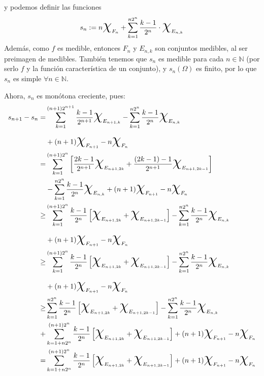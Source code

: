 \documentclass[11pt, a4paper]{article}
\makeatletter
\newif\IfInSansMode
\let\oldsf\sffamily
\renewcommand*{\sffamily}{\oldsf\mathversion{sans}\InSansModetrue}
\let\oldnorm\normalfont
\renewcommand*{\normalfont}{\oldnorm\InSansModefalse\mathversion{normal}}
\renewenvironment{proof}[1][\proofname] {\par\pushQED{\qed}\normalfont\topsep6\p@\@plus6\p@\relax\trivlist\item[\hskip\labelsep\itshape\sffamily#1\@addpunct{.}]\ignorespaces}{\popQED\endtrivlist\@endpefalse}
\theoremstyle{theorem-style}
\theoremstyle{definition-style}
\theoremstyle{remark-style}
\theoremstyle{example-style}
\makeatother
\begin{document}
\begin{proof}
  y podemos definir las funciones
  \[
    s_n := n\text{\huge {$\chi$}}_{F_n} + \sum_{k=1}^{n2^n}\dfrac{k-1}{2^n}\cdot \text{\huge {$\chi$}}_{E_{n,k}}
  \]
  Además, como $f$ es medible, entonces $F_n$ y $E_{n,k}$ son conjuntos medibles, al ser preimagen de medibles. También tenemos que $s_n$ es medible para cada $n \in \mathbb{N}$ (por serlo $f$ y la función característica de un conjunto), y $s_n(\Omega)$ es finito, por lo que $s_n$ es simple $\forall n \in \mathbb{N}$.

  Ahora, ${s_n}$ es monótona creciente, pues:
      \begin{align*}
 s_{n+1}-s_n =&  \sum_{k=1}^{(n+1)2^{n+1}} \frac{k-1}{2^{n+1}} \text{\huge $\chi$}_{E_{n+1,k}} 
				- \sum_{k=1}^{n2^n} \frac{k-1}{2^n} \text{\huge $\chi$}_{E_{n,k}} 
				\\
			&+	(n+1) \text{\huge{$\chi$}}_{F_{n+1}} - n \text{\huge{$\chi$}}_{F_n} 
				\\ %
			=& \sum_{k=1}^{(n+1)2^{n}} \left[ \frac{2k-1}{2^{n+1}} \text{\huge $\chi$}_{E_{n+1,2k}} 
									+ \frac{(2k-1)-1}{2^{n+1}} \text{\huge $\chi$}_{E_{n+1,2k-1}}  \right]
									\\
			&
				- \sum_{k=1}^{n2^n} \frac{k-1}{2^n} \text{\huge $\chi$}_{E_{n,k}} 
				+	(n+1) \text{\huge{$\chi$}}_{F_{n+1}} - n \text{\huge{$\chi$}}_{F_n}
				\\
			\geq& \sum_{k=1}^{(n+1)2^{n}} \frac{k-1}{2^{n}} \left[  \text{\huge $\chi$}_{E_{n+1,2k}} 
									+ \text{\huge $\chi$}_{E_{n+1,2k-1}}  \right]
				- \sum_{k=1}^{n2^n} \frac{k-1}{2^n} \text{\huge $\chi$}_{E_{n,k}} 
				\\
				&+	(n+1) \text{\huge{$\chi$}}_{F_{n+1}} - n \text{\huge{$\chi$}}_{F_n}\\
				\geq& \sum_{k=1}^{(n+1)2^{n}} \frac{k-1}{2^{n}} \left[  \text{\huge $\chi$}_{E_{n+1,2k}} 
									+ \text{\huge $\chi$}_{E_{n+1,2k-1}}  \right]
				- \sum_{k=1}^{n2^n} \frac{k-1}{2^n} \text{\huge $\chi$}_{E_{n,k}} 
				\\
				&+	(n+1) \text{\huge{$\chi$}}_{F_{n+1}} - n \text{\huge{$\chi$}}_{F_n}
				\\ %
				\geq& \sum_{k=1}^{n2^{n}} \frac{k-1}{2^{n}} \left[  \text{\huge $\chi$}_{E_{n+1,2k}} 
									+ \text{\huge $\chi$}_{E_{n+1,2k-1}}  \right]
				- \sum_{k=1}^{n2^n} \frac{k-1}{2^n} \text{\huge $\chi$}_{E_{n,k}} 
				\\
				+&\sum_{k=1+n 2^n}^{(n+1)2^{n}} \frac{k-1}{2^{n}} \left[  \text{\huge $\chi$}_{E_{n+1,2k}} 
									+ \text{\huge $\chi$}_{E_{n+1,2k-1}}  \right]
				+	(n+1) \text{\huge{$\chi$}}_{F_{n+1}} - n \text{\huge{$\chi$}}_{F_n}
                                \\
                                = & \sum_{k=1+n 2^n}^{(n+1)2^{n}} \frac{k-1}{2^{n}} \left[  \text{\huge $\chi$}_{E_{n+1,2k}} 
									+ \text{\huge $\chi$}_{E_{n+1,2k-1}}  \right]
				+	(n+1) \text{\huge{$\chi$}}_{F_{n+1}} - n \text{\huge{$\chi$}}_{F_n}
 \end{align*}


\end{proof}
\end{document}
